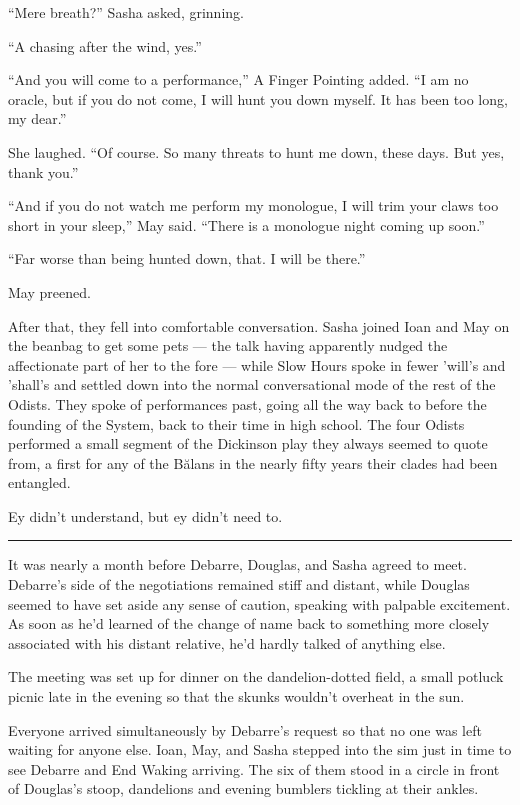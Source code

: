 ``Mere breath?'' Sasha asked, grinning.

``A chasing after the wind, yes.''

``And you will come to a performance,'' A Finger Pointing added. ``I am no oracle, but if you do not come, I will hunt you down myself. It has been too long, my dear.''

She laughed. ``Of course. So many threats to hunt me down, these days. But yes, thank you.''

``And if you do not watch me perform my monologue, I will trim your claws too short in your sleep,'' May said. ``There is a monologue night coming up soon.''

``Far worse than being hunted down, that. I will be there.''

May preened.

After that, they fell into comfortable conversation. Sasha joined Ioan and May on the beanbag to get some pets — the talk having apparently nudged the affectionate part of her to the fore — while Slow Hours spoke in fewer 'will's and 'shall's and settled down into the normal conversational mode of the rest of the Odists. They spoke of performances past, going all the way back to before the founding of the System, back to their time in high school. The four Odists performed a small segment of the Dickinson play they always seemed to quote from, a first for any of the Bălans in the nearly fifty years their clades had been entangled.

Ey didn't understand, but ey didn't need to.

\begin{center}\rule{0.5\linewidth}{0.5pt}\end{center}

It was nearly a month before Debarre, Douglas, and Sasha agreed to meet. Debarre's side of the negotiations remained stiff and distant, while Douglas seemed to have set aside any sense of caution, speaking with palpable excitement. As soon as he'd learned of the change of name back to something more closely associated with his distant relative, he'd hardly talked of anything else.

The meeting was set up for dinner on the dandelion-dotted field, a small potluck picnic late in the evening so that the skunks wouldn't overheat in the sun.

Everyone arrived simultaneously by Debarre's request so that no one was left waiting for anyone else. Ioan, May, and Sasha stepped into the sim just in time to see Debarre and End Waking arriving. The six of them stood in a circle in front of Douglas's stoop, dandelions and evening bumblers tickling at their ankles.

